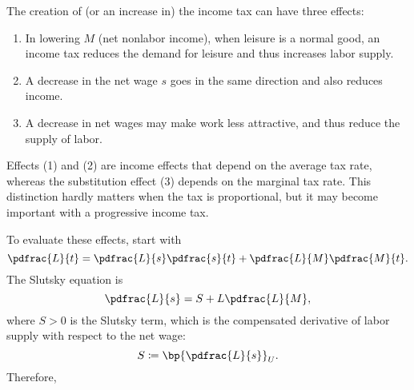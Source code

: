 \documentclass[12pt]{report}
\newcommand{\CiteReference}{../reference.bib}
\theoremstyle{definition}
\begin{document}
The creation of (or an increase in) the income tax can have three effects:
\begin{enumerate}[topsep=0pt, leftmargin=20pt, itemsep=0pt, label=(\arabic*)]
	\setlength{\parskip}{10pt} 
	\item In lowering $M$ (net nonlabor income), when leisure is a normal good, an income tax reduces the demand for leisure and thus increases labor supply.
	\item A decrease in the net wage $s$ goes in the same direction and also reduces income.
	\item A decrease in net wages may make work less attractive, and thus reduce the supply of labor.
\end{enumerate}

Effects (1) and (2) are income effects that depend on the average tax rate, whereas the substitution effect (3) depends on the marginal tax rate. This distinction hardly matters when the tax is proportional, but it may become important with a progressive income tax.

To evaluate these effects, start with 
\begin{equation}
    \notag 
    \pdfrac{L}{t} = \pdfrac{L}{s} \pdfrac{s}{t} + \pdfrac{L}{M} \pdfrac{M}{t}.
\end{equation}
The Slutsky equation is 
\begin{equation}
    \notag 
    \pdfrac{L}{s} = S + L \pdfrac{L}{M},
\end{equation}
where $S > 0$ is the Slutsky term, which is the compensated derivative of labor supply with respect to the net wage:
\begin{equation}
    \notag 
    S \coloneqq \bp{\pdfrac{L}{s}}_{U}.
\end{equation}
Therefore, 


















%  
\end{document}
